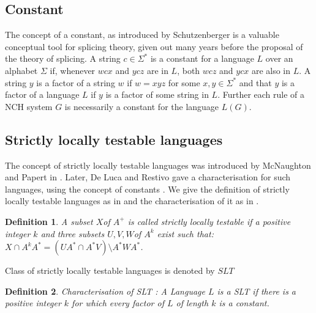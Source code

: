 \documentclass{llncs}
\newtheorem{defin}{Definition}
\newcommand{\sg}{\Sigma}
\begin{document}
\subsection{Constant}
\par The concept of a constant, as introduced by Schutzenberger \cite{swat}
 is a valuable conceptual tool for splicing theory, given out many years before
  the proposal  of the theory of splicing. A string $c\in \sg^*$ is a constant for  a
  language $L$ over an alphabet $\sg$ if, whenever $wcx$ and $ycz$ are in $L$,
   both $wcz$ and $ycx$ are also in $L$. A string $y$ is a factor of a string
   $w$ if $w=xyz$ for some $x,y\in\sg^*$ and that $y$ is a factor of a language
    $L$ if $y$ is a factor of some string in $L$. Further each rule of a NCH
     system $G$ is necessarily a constant for the language $L(G)$.

  \subsection{Strictly locally testable languages}
  The concept of strictly locally testable languages   was introduced
  by McNaughton and Papert in \cite{Mc}.  Later, De Luca and Restivo
  \cite{Luc} gave a characterisation for such languages, using  the concept of
  constants \cite{swat}. We give the definition of strictly locally testable languages as in
  \cite{Mc} and the characterisation of it as in \cite{Luc}.
  \begin{defin}\cite{Mc}
  A subset $X $of $A^+$ is called strictly locally testable if a
positive integer $k$ and three subsets $U, V, W $of $A^k$  exist
such that:$ X \cap A^kA^* = (UA^* \cap A^*V)\setminus A^*WA^*$.
  \end{defin}
  Class of strictly locally testable languages is denoted by $SLT$
\begin{defin}{Characterisation of SLT \cite{Luc}:}
 A Language $L$ is a SLT if there is a positive integer $k$ for
which every factor of $L$ of length $k$ is a constant.
\end{defin}
\end{document}
